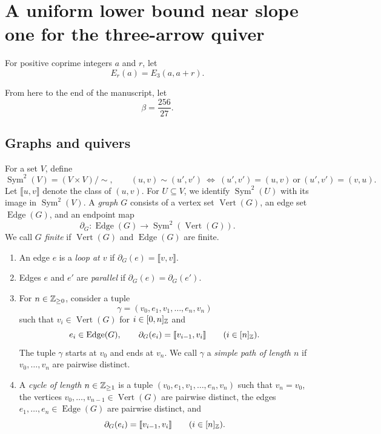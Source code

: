 \section{A uniform lower bound near slope one for the three-arrow quiver}\label{sec:central-lower}
\begin{definition}\label{def:central-euler-characteristic}
For positive coprime integers $a$ and $r$, let
\[
 E_r(a)=E_3(a,a+r).
\]
\end{definition}
From here to the end of the manuscript, let
\[
 \beta=\frac{256}{27}.
\]

\subsection{Graphs and quivers}\label{subsec:graphs-quivers}
\begin{definition}[Graphs]\label{def:graphs}
For a set $V$, define
\[
 \operatorname{Sym}^{2}(V)=(V\times V)/{\sim},\qquad
 (u,v)\sim(u',v')\ \Longleftrightarrow\
 (u',v')=(u,v)\ \text{or}\ (u',v')=(v,u).
\]
Let $\llbracket u,v\rrbracket$ denote the class of $(u,v)$.
For $U\subseteq V$, we identify $\operatorname{Sym}^{2}(U)$ with its image in $\operatorname{Sym}^{2}(V)$.
A \textit{graph} $G$ consists of a vertex set $\operatorname{Vert}(G)$,
an edge set $\operatorname{Edge}(G)$, and an endpoint map
\[
 \partial_G:\operatorname{Edge}(G)\longrightarrow
 \operatorname{Sym}^{2}(\operatorname{Vert}(G)).
\]
We call $G$ \textit{finite} if $\operatorname{Vert}(G)$ and $\operatorname{Edge}(G)$ are finite.
\begin{enumerate}[label=\arabic*.,ref=\arabic*,font=\itshape]
\item An edge $e$ is a \textit{loop at $v$} if $\partial_G(e)=\llbracket v,v\rrbracket$.
\item Edges $e$ and $e'$ are \textit{parallel} if $\partial_G(e)=\partial_G(e')$.
\item\label{d:graph-path-tuple} For $n\in\mathbb Z_{\ge0}$, consider a tuple
\[
 \gamma=(v_0,e_1,v_1,\ldots,e_n,v_n)
\]
such that $v_i\in\operatorname{Vert}(G)$ for $i\in[0,n]_{\mathbb Z}$ and
\[
 e_i\in\operatorname{Edge}(G),\qquad
 \partial_G(e_i)=\llbracket v_{i-1},v_i\rrbracket
 \qquad(i\in[n]_{\mathbb Z}).
\]
The tuple $\gamma$ starts at $v_0$ and ends at $v_n$.
We call $\gamma$ a \textit{simple path of length $n$} if $v_0,\ldots,v_n$ are pairwise distinct.
\item A \textit{cycle of length $n\in\mathbb Z_{\ge1}$} is a tuple
$(v_0,e_1,v_1,\ldots,e_n,v_n)$ such that $v_n=v_0$,
the vertices $v_0,\ldots,v_{n-1}\in\operatorname{Vert}(G)$ are pairwise distinct,
the edges $e_1,\ldots,e_n\in\operatorname{Edge}(G)$ are pairwise distinct, and
\[
 \partial_G(e_i)=\llbracket v_{i-1},v_i\rrbracket\qquad(i\in[n]_{\mathbb Z}).
\]
\end{enumerate}
\end{definition}

